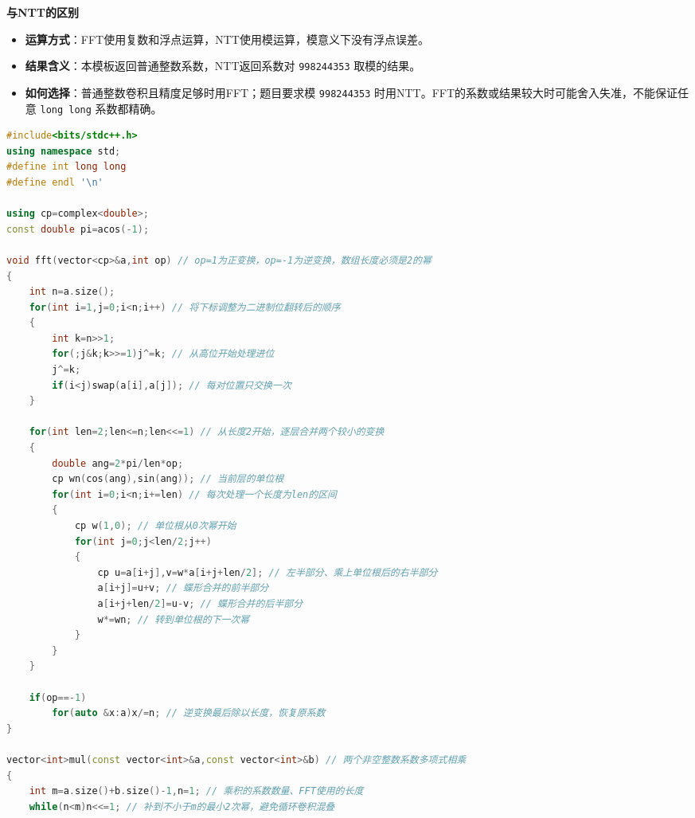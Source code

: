 \documentclass[10pt,landscape,a4paper]{article}
\begin{document}
\begin{multicols*}{3}
\par\addvspace{0.7ex}\noindent\textbf{与NTT的区别}\par\nobreak
\begin{itemize}
\item \textbf{运算方式}：FFT使用复数和浮点运算，NTT使用模运算，模意义下没有浮点误差。
\item \textbf{结果含义}：本模板返回普通整数系数，NTT返回系数对 \texttt{9\allowbreak{}9\allowbreak{}8\allowbreak{}2\allowbreak{}4\allowbreak{}4\allowbreak{}3\allowbreak{}5\allowbreak{}3} 取模的结果。
\item \textbf{如何选择}：普通整数卷积且精度足够时用FFT；题目要求模 \texttt{9\allowbreak{}9\allowbreak{}8\allowbreak{}2\allowbreak{}4\allowbreak{}4\allowbreak{}3\allowbreak{}5\allowbreak{}3} 时用NTT。FFT的系数或结果较大时可能舍入失准，不能保证任意 \texttt{l\allowbreak{}o\allowbreak{}n\allowbreak{}g\allowbreak{} \allowbreak{}l\allowbreak{}o\allowbreak{}n\allowbreak{}g} 系数都精确。
\end{itemize}
\par{}\par
\begin{lstlisting}[language=C++]
#include<bits/stdc++.h>
using namespace std;
#define int long long
#define endl '\n'

using cp=complex<double>;
const double pi=acos(-1);

void fft(vector<cp>&a,int op) // op=1为正变换，op=-1为逆变换，数组长度必须是2的幂
{
    int n=a.size();
    for(int i=1,j=0;i<n;i++) // 将下标调整为二进制位翻转后的顺序
    {
        int k=n>>1;
        for(;j&k;k>>=1)j^=k; // 从高位开始处理进位
        j^=k;
        if(i<j)swap(a[i],a[j]); // 每对位置只交换一次
    }

    for(int len=2;len<=n;len<<=1) // 从长度2开始，逐层合并两个较小的变换
    {
        double ang=2*pi/len*op;
        cp wn(cos(ang),sin(ang)); // 当前层的单位根
        for(int i=0;i<n;i+=len) // 每次处理一个长度为len的区间
        {
            cp w(1,0); // 单位根从0次幂开始
            for(int j=0;j<len/2;j++)
            {
                cp u=a[i+j],v=w*a[i+j+len/2]; // 左半部分、乘上单位根后的右半部分
                a[i+j]=u+v; // 蝶形合并的前半部分
                a[i+j+len/2]=u-v; // 蝶形合并的后半部分
                w*=wn; // 转到单位根的下一次幂
            }
        }
    }

    if(op==-1)
        for(auto &x:a)x/=n; // 逆变换最后除以长度，恢复原系数
}

vector<int>mul(const vector<int>&a,const vector<int>&b) // 两个非空整数系数多项式相乘
{
    int m=a.size()+b.size()-1,n=1; // 乘积的系数数量、FFT使用的长度
    while(n<m)n<<=1; // 补到不小于m的最小2次幂，避免循环卷积混叠


\end{lstlisting}
\end{multicols*}
\end{document}
